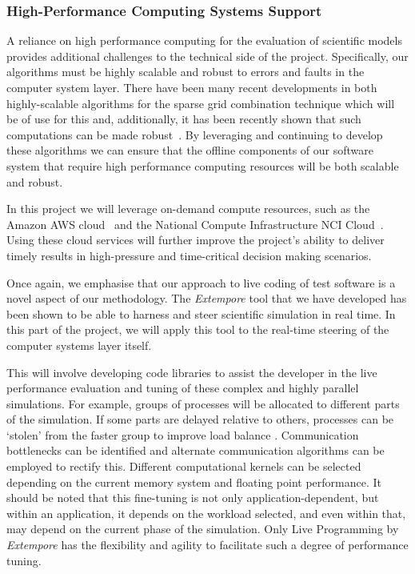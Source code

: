 \subsubsection*{High-Performance Computing Systems Support}

A reliance on high performance computing for the evaluation of
scientific models provides additional challenges to the technical side
of the project. Specifically, our algorithms must be highly scalable
and robust to errors and faults in the computer system layer. There
have been many recent developments in both highly-scalable algorithms
for the sparse grid combination technique \cite{sgctalg15,pdsec15extsgctalg} 
which will be of use for
this and, additionally, it has been recently shown that such
computations can be made
robust~\parencite{HardingHLS2015,AliEtal2015,Ali11022016}. By leveraging and
continuing to develop these algorithms we can ensure that the
offline components of our software system that require high performance
computing resources will be both scalable and robust.

In this project we will leverage on-demand compute resources, such as
the Amazon AWS cloud~\parencite{amazonAws} and the National Compute
Infrastructure NCI Cloud~\parencite{nciCloud}. Using these cloud
services will further improve the project's ability to deliver timely
results in high-pressure and time-critical decision making scenarios.

Once again, we emphasise that our approach to live coding of test
software is a novel aspect of our methodology. The \emph{Extempore}
tool that we have developed has been shown to be able to harness and
steer scientific simulation in real time. In this part of the project,
we will apply this tool to the real-time steering of the computer
systems layer itself.

This will involve developing code libraries to assist the developer in
the live performance evaluation and tuning of these complex and highly
parallel simulations. For example, groups of processes will be
allocated to different parts of the simulation. If some parts are
delayed relative to others, processes can be `stolen' from the faster
group to improve load balance \cite{parSGCT16}. Communication
bottlenecks can be identified and alternate communication algorithms
can be employed to rectify this.  Different computational kernels can
be selected depending on the current memory system and floating point
performance.  It should be noted that this fine-tuning is not only
application-dependent, but within an application, it depends on the
workload selected, and even within that, may depend on the current
phase of the simulation. Only Live Programming by \emph{Extempore} has
the flexibility and agility to facilitate such a degree of performance
tuning.
